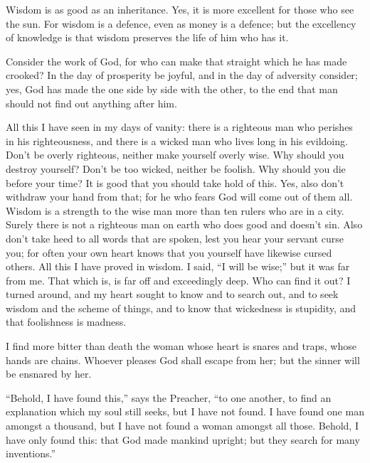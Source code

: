  Wisdom is as good as an inheritance. Yes, it is more
excellent for those who see the sun.  For wisdom is a
defence, even as money is a defence; but the excellency of knowledge is
that wisdom preserves the life of him who has it.

 Consider the work of God, for who can make that straight
which he has made crooked?  In the day of prosperity be
joyful, and in the day of adversity consider; yes, God has made the one
side by side with the other, to the end that man should not find out
anything after him.

 All this I have seen in my days of vanity: there is a
righteous man who perishes in his righteousness, and there is a wicked
man who lives long in his evildoing.  Don't be overly
righteous, neither make yourself overly wise. Why should you destroy
yourself?  Don't be too wicked, neither be foolish. Why
should you die before your time?  It is good that you
should take hold of this. Yes, also don't withdraw your hand from that;
for he who fears God will come out of them all.  Wisdom is
a strength to the wise man more than ten rulers who are in a city.
 Surely there is not a righteous man on earth who does good
and doesn't sin.  Also don't take heed to all words that
are spoken, lest you hear your servant curse you;  for
often your own heart knows that you yourself have likewise cursed
others.  All this I have proved in wisdom. I said, ``I will
be wise;'' but it was far from me.  That which is, is far
off and exceedingly deep. Who can find it out?  I turned
around, and my heart sought to know and to search out, and to seek
wisdom and the scheme of things, and to know that wickedness is
stupidity, and that foolishness is madness.

 I find more bitter than death the woman whose heart is
snares and traps, whose hands are chains. Whoever pleases God shall
escape from her; but the sinner will be ensnared by her.

 ``Behold, I have found this,'' says the Preacher, ``to one
another, to find an explanation  which my soul still seeks,
but I have not found. I have found one man amongst a thousand, but I
have not found a woman amongst all those.  Behold, I have
only found this: that God made mankind upright; but they search for many
inventions.''

